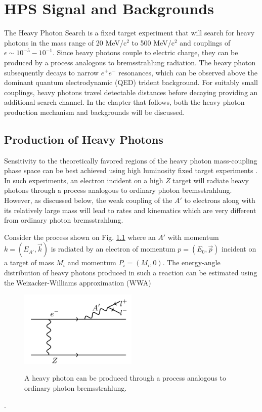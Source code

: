 
\chapter{HPS Signal and Backgrounds}

The Heavy Photon Search is a fixed target experiment that will search for heavy
photons in the mass range of 20 MeV/c$^{2}$ to 500 MeV/c$^{2}$ and couplings
of $\epsilon \sim 10^{-5} - 10^{-1}$.  Since heavy photons couple to electric
charge, they can be produced by a process analogous to bremsstrahlung 
radiation.  The heavy photon subsequently decays to narrow $e^+e^-$ resonances, 
which can be observed above the dominant quantum electrodynamic (QED) trident
background.  For suitably small couplings, heavy photons travel detectable 
distances before decaying providing an additional search channel.  In the 
chapter that follows, both the heavy photon production mechanism and backgrounds
will be discussed.

\section{Production of Heavy Photons}

Sensitivity to the theoretically favored regions of the heavy photon 
mass-coupling phase space can be best achieved using high luminosity fixed
target experiments \cite{Bjorken:2009mm}.  In such experiments, an electron
incident on a high $Z$ target will radiate heavy photons 
through a process analogous to ordinary photon bremsstrahlung. 
%
%
However, as discussed below, the weak coupling
of the $A'$ to electrons along with its relatively large mass will lead to 
rates and kinematics which are very different from ordinary photon 
bremsstrahlung.

Consider the process shown on Fig. \ref{fig:ap_production} where an $A'$ with
momentum $k = (E_{A'}, \vec{k})$ is radiated by an electron of momentum 
$p = (E_0, \vec{p})$ incident on a target of mass $M_i$ and momentum 
$P_i = (M_i, 0)$. The energy-angle distribution of heavy photons produced in 
such a reaction can be estimated using the Weizacker-Williams approximation (WWA)
\begin{figure}[t]
    \centering
    \caption{A heavy photon can be produced through a process analogous to 
             ordinary photon bremsstrahlung.}
    \includegraphics[width=0.5\textwidth]{images/aprime_brem.png}
    \label{fig:ap_production}
\end{figure}  
\cite{Bjorken:2009mm, Tsai:1986tx}.

